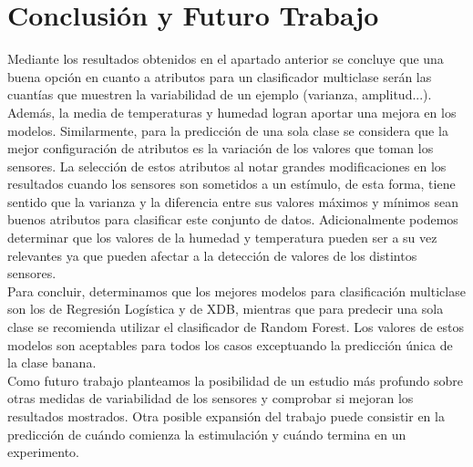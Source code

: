 \documentclass{esannV2}
\begin{document}
\section{Conclusión y Futuro Trabajo}
Mediante los resultados obtenidos en el apartado anterior se concluye que una buena opción en cuanto a atributos para un clasificador multiclase serán las cuantías que muestren la variabilidad de un ejemplo (varianza, amplitud...). Además, la media de temperaturas y humedad logran aportar una mejora en los modelos. Similarmente, para la predicción de una sola clase se considera que la mejor configuración de atributos es la variación de los valores que toman los sensores. La selección de estos atributos al notar grandes modificaciones en los resultados cuando los sensores son sometidos a un estímulo, de esta forma, tiene sentido que la varianza y la diferencia entre sus valores máximos y mínimos sean buenos atributos para clasificar este conjunto de datos. Adicionalmente podemos determinar que los valores de la humedad y temperatura pueden ser a su vez relevantes ya que pueden afectar a la detección de valores de los distintos sensores. \\ 
Para concluir, determinamos que los mejores modelos para clasificación multiclase son los de Regresión  Logística y de XDB, mientras que para predecir una sola clase se recomienda utilizar el clasificador de Random Forest. Los valores de estos modelos son aceptables para todos los casos exceptuando la predicción única de la clase banana.\\ 
Como futuro trabajo planteamos la posibilidad de un estudio más profundo sobre otras medidas de variabilidad de los sensores y comprobar si mejoran los resultados mostrados. Otra posible expansión del trabajo puede consistir en la predicción de cuándo comienza la estimulación y cuándo termina  en un experimento.

\end{document}
